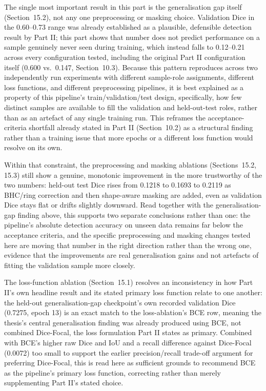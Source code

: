 
The single most important result in this part is the generalisation gap itself
(Section~15.2), not any one preprocessing or masking choice. Validation Dice in the 0.60--0.73 range
was already established as a plausible, defensible detection result by Part II; this part shows that
number does not predict performance on a sample genuinely never seen during training, which instead
falls to 0.12--0.21 across every configuration tested, including the original Part II configuration
itself (0.600 vs.\ 0.147, Section~10.3). Because this pattern reproduces across two independently run
experiments with different sample-role assignments, different loss functions, and different
preprocessing pipelines, it is best explained as a property of this pipeline's train/validation/test
design, specifically, how few distinct samples are available to fill the validation and held-out-test
roles, rather than as an artefact of any single training run. This reframes the acceptance-criteria
shortfall already stated in Part II (Section~10.2) as a structural finding rather than a training
issue that more epochs or a different loss function would resolve on its own.

Within that constraint, the preprocessing and masking ablations (Sections~15.2, 15.3) still show a
genuine, monotonic improvement in the more trustworthy of the two numbers: held-out test Dice rises
from 0.1218 to 0.1693 to 0.2119 as BHC/ring correction and then shape-aware masking are added, even as
validation Dice stays flat or drifts slightly downward. Read together with the generalisation-gap
finding above, this supports two separate conclusions rather than one: the pipeline's absolute
detection accuracy on unseen data remains far below the acceptance criteria, and the specific
preprocessing and masking changes tested here are moving that number in the right direction rather
than the wrong one, evidence that the improvements are real generalisation gains and not artefacts of
fitting the validation sample more closely.

The loss-function ablation (Section~15.1) resolves an inconsistency in how Part II's own headline
result and its stated primary loss function relate to one another: the held-out generalisation-gap
checkpoint's own recorded validation Dice (0.7275, epoch 13) is an exact match to the loss-ablation's
BCE row, meaning the thesis's central generalisation finding was already produced using BCE, not
combined Dice-Focal, the loss formulation Part II states as primary. Combined with BCE's higher raw
Dice and IoU and a recall difference against Dice-Focal (0.0072) too small to support the earlier
precision/recall trade-off argument for preferring Dice-Focal, this is read here as sufficient grounds
to recommend BCE as the pipeline's primary loss function, correcting rather than merely supplementing
Part II's stated choice.

